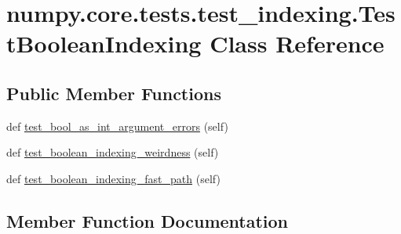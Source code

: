 \hypertarget{classnumpy_1_1core_1_1tests_1_1test__indexing_1_1TestBooleanIndexing}{}\section{numpy.\+core.\+tests.\+test\+\_\+indexing.\+Test\+Boolean\+Indexing Class Reference}
\label{classnumpy_1_1core_1_1tests_1_1test__indexing_1_1TestBooleanIndexing}
\subsection*{Public Member Functions}
\begin{DoxyCompactItemize}
\item 
def \hyperlink{classnumpy_1_1core_1_1tests_1_1test__indexing_1_1TestBooleanIndexing_a10a3c68a37ccdf818da280a033d310e5}{test\+\_\+bool\+\_\+as\+\_\+int\+\_\+argument\+\_\+errors} (self)
\item 
def \hyperlink{classnumpy_1_1core_1_1tests_1_1test__indexing_1_1TestBooleanIndexing_a682d7ee20b283a9d46a50a315a94cf93}{test\+\_\+boolean\+\_\+indexing\+\_\+weirdness} (self)
\item 
def \hyperlink{classnumpy_1_1core_1_1tests_1_1test__indexing_1_1TestBooleanIndexing_a042e7e45a5f00945df5af2cb0fbf5f1b}{test\+\_\+boolean\+\_\+indexing\+\_\+fast\+\_\+path} (self)
\end{DoxyCompactItemize}


\subsection{Member Function Documentation}
\mbox{\label{classnumpy_1_1core_1_1tests_1_1test__indexing_1_1TestBooleanIndexing_a10a3c68a37ccdf818da280a033d310e5}} 
